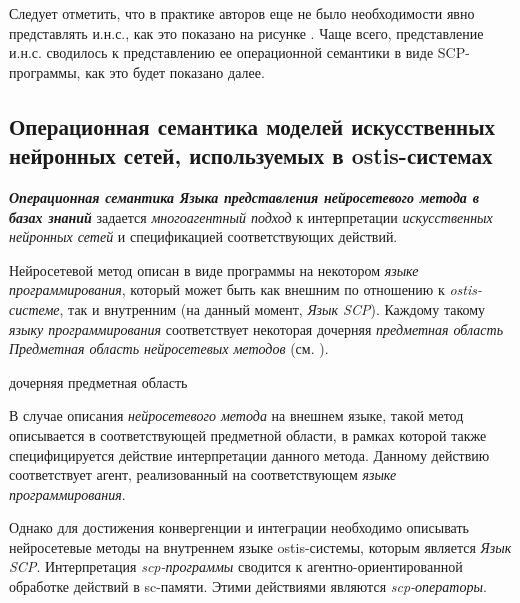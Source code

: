 Следует отметить, что в практике авторов еще не было необходимости явно представлять и.н.с., как это показано на рисунке \textit{}. Чаще всего, представление и.н.с. сводилось к представлению ее операционной семантики в виде SCP-программы, как это будет показано далее.

\subsection{Операционная семантика моделей искусственных нейронных сетей, используемых в ostis-системах}
\label{subsec_ann_oper}

\textbf{\textit{Операционная семантика Языка представления нейросетевого метода в базах знаний}} задается \textit{многоагентный подход} к интерпретации \textit{искусственных нейронных сетей} и спецификацией соответствующих действий.

Нейросетевой метод описан в виде программы на некотором \textit{языке программирования}, который может быть как внешним по отношению к \textit{ostis-системе}, так и внутренним (на данный момент, \textit{Язык SCP}). Каждому такому \textit{языку программирования} соответствует некоторая дочерняя \textit{предметная область} \textit{Предметная область нейросетевых методов} (см. ).

\begin{SCn}
	\begin{scnrelfromset}{дочерняя предметная область}
	\end{scnrelfromset}
\end{SCn}

В случае описания \textit{нейросетевого метода} на внешнем языке, такой метод описывается в соответствующей предметной области, в рамках которой также специфицируется действие интерпретации данного метода. Данному действию соответствует агент, реализованный на соответствующем \textit{языке программирования}.

Однако для достижения конвергенции и интеграции необходимо описывать нейросетевые методы на внутреннем языке ostis-системы, которым является \textit{Язык SCP}.
Интерпретация \textit{scp-программы} сводится к агентно-ориентированной обработке действий в sc-памяти. Этими действиями являются \textit{scp-операторы}.

